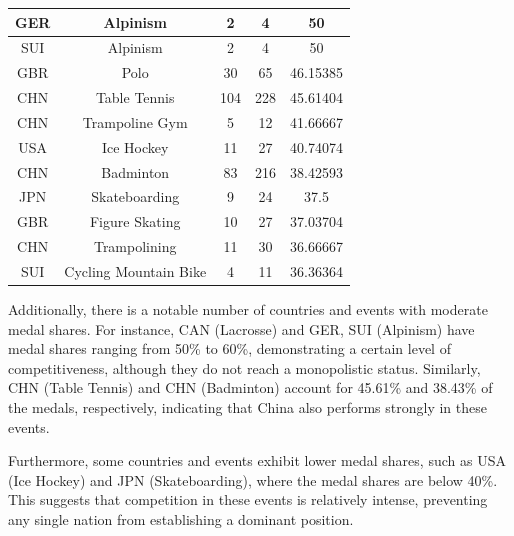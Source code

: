 \documentclass{mcmthesis}
\begin{document}
\begin{table}[H]
\begin{tabular}{|c|c|c|c|c|}
\hline
GER              & Alpinism              & 2                       & 4                              & 50                       \\ 
\hline
SUI              & Alpinism              & 2                       & 4                              & 50                       \\ 
\hline
GBR              & Polo                  & 30                      & 65                             & 46.15385                 \\ 
\hline
CHN              & Table Tennis          & 104                     & 228                            & 45.61404                 \\ 
\hline
CHN              & Trampoline Gym        & 5                       & 12                             & 41.66667                 \\ 
\hline
USA              & Ice Hockey            & 11                      & 27                             & 40.74074                 \\ 
\hline
CHN              & Badminton             & 83                      & 216                            & 38.42593                 \\ 
\hline
JPN              & Skateboarding         & 9                       & 24                             & 37.5                     \\ 
\hline
GBR              & Figure Skating        & 10                      & 27                             & 37.03704                 \\ 
\hline
CHN              & Trampolining          & 11                      & 30                             & 36.66667                 \\ 
\hline
SUI              & Cycling Mountain Bike & 4                       & 11                             & 36.36364                 \\
\hline
\end{tabular}
\end{table}
Additionally, there is a notable number of countries and events with moderate medal shares. For instance, CAN (Lacrosse) and GER, SUI (Alpinism) have medal shares ranging from 50\% to 60\%, demonstrating a certain level of competitiveness, although they do not reach a monopolistic status. Similarly, CHN (Table Tennis) and CHN (Badminton) account for 45.61\% and 38.43\% of the medals, respectively, indicating that China also performs strongly in these events.

Furthermore, some countries and events exhibit lower medal shares, such as USA (Ice Hockey) and JPN (Skateboarding), where the medal shares are below 40\%. This suggests that competition in these events is relatively intense, preventing any single nation from establishing a dominant position.
\end{document}
